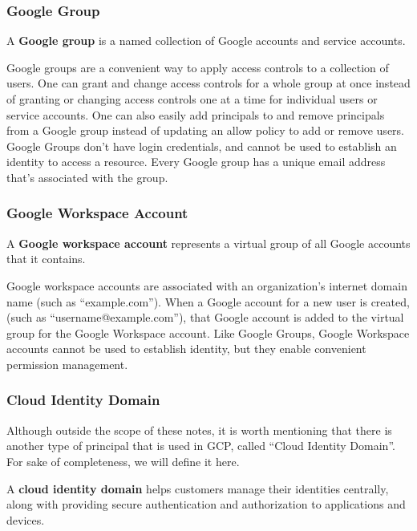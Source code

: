 \subsubsection{Google Group}

A \textbf{Google group} is a named collection of Google accounts and service accounts.
\ed

Google groups are a convenient way to apply access controls to a collection of users. One can grant and change
access controls for a whole group at once instead of granting or changing access controls one at a time for
individual users or service accounts. One can also easily add principals to and remove principals from a Google
group instead of updating an allow policy to add or remove users. Google Groups don't have login credentials, and
cannot be used to establish an identity to access a resource. Every Google group has a unique email address that's
associated with the group.

\subsubsection{Google Workspace Account}

A \textbf{Google workspace account} represents a virtual group of all Google accounts that it contains.
\ed

Google workspace accounts are associated with an organization's internet domain name (such as ``example.com''). When
a Google account for a new user is created, (such as ``username@example.com''), that Google account is added to the
virtual group for the Google Workspace account. Like Google Groups, Google Workspace accounts cannot be used to
establish identity, but they enable convenient permission management.

\subsubsection{Cloud Identity Domain}

Although outside the scope of these notes, it is worth mentioning that there is another type of principal that is
used in GCP, called ``Cloud Identity Domain''. For sake of completeness, we will define it here.

A \textbf{cloud identity domain} helps customers manage their identities centrally, along with providing secure
authentication and authorization to applications and devices.
\ed

